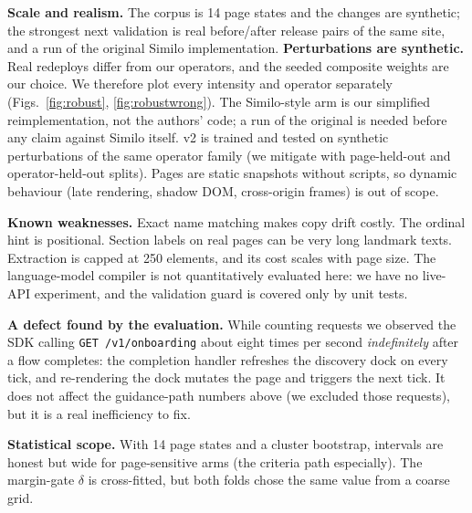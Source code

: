 \documentclass[conference]{IEEEtran}
\begin{document}
\textbf{Scale and realism.} The corpus is 14 page states and the changes are synthetic; the strongest next validation is real before/after release pairs of the same site, and a run of the original Similo implementation. \textbf{Perturbations are synthetic.} Real redeploys differ from our operators, and the seeded composite weights are our choice. We therefore plot every intensity and operator separately (Figs.~\ref{fig:robust}, \ref{fig:robustwrong}). The Similo-style arm is our simplified reimplementation, not the authors' code; a run of the original is needed before any claim against Similo itself. v2 is trained and tested on synthetic perturbations of the same operator family (we mitigate with page-held-out and operator-held-out splits). Pages are static snapshots without scripts, so dynamic behaviour (late rendering, shadow DOM, cross-origin frames) is out of scope.

\textbf{Known weaknesses.} Exact name matching makes copy drift costly. The ordinal hint is positional. Section labels on real pages can be very long landmark texts. Extraction is capped at 250 elements, and its cost scales with page size. The language-model compiler is not quantitatively evaluated here: we have no live-API experiment, and the validation guard is covered only by unit tests.

\textbf{A defect found by the evaluation.} While counting requests we observed the SDK calling \texttt{GET /v1/onboarding} about eight times per second \emph{indefinitely} after a flow completes: the completion handler refreshes the discovery dock on every tick, and re-rendering the dock mutates the page and triggers the next tick. It does not affect the guidance-path numbers above (we excluded those requests), but it is a real inefficiency to fix.

\textbf{Statistical scope.} With 14 page states and a cluster bootstrap, intervals are honest but wide for page-sensitive arms (the criteria path especially). The margin-gate $\delta$ is cross-fitted, but both folds chose the same value from a coarse grid.

\end{document}
